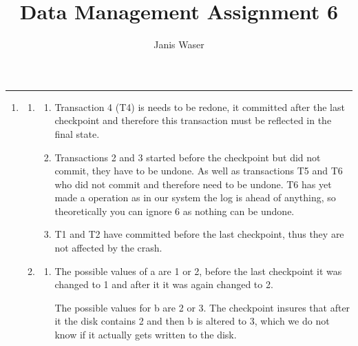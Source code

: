 \documentclass[12pt]{extarticle}
\title{Data Management Assignment 6}
\author{Janis Waser}
\begin{document}
\maketitle \vspace{-10mm}
\rule{\linewidth}{0.4pt}


\begin{flushleft}
\begin{enumerate}[label=\textbf{\Alph*.}]

\item 
\begin{enumerate}[label=\arabic*.]
\item \begin{enumerate}[label=(\alph*)]
\item Transaction 4 (T4) is needs to be redone, it committed after the last checkpoint and therefore this transaction must be reflected in the final state.
\item Transactions 2 and 3 started before the checkpoint but did not commit, they have to be undone. As well as transactions T5 and T6 who did not commit and therefore need to be undone. T6 has yet made a operation as in our system the log is ahead of anything, so theoretically you can ignore 6 as nothing can be undone.
\item T1 and T2 have committed before the last checkpoint, thus they are not affected by the crash.
\end{enumerate}
 \item \begin{enumerate}[label=(\alph*)] 
\item The possible values of a are 1 or 2, before the last checkpoint it was changed to 1 and after it it was again changed to 2. 

The possible values for b are 2 or 3. The checkpoint insures that after it the disk contains 2 and then b is altered to 3, which we do not know if it actually gets written to the disk. 


\end{enumerate}
\end{enumerate}
\end{enumerate}
\end{flushleft}
\end{document}
